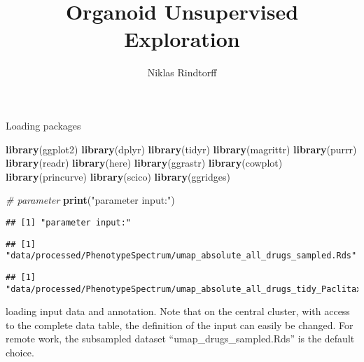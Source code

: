 \documentclass[
]{article}
\title{Organoid Unsupervised Exploration}
\author{Niklas Rindtorff}
\date{}
\newenvironment{Shaded}{\begin{snugshade}}{\end{snugshade}}
\newcommand{\CommentTok}[1]{\textcolor[rgb]{0.56,0.35,0.01}{\textit{#1}}}
\newcommand{\KeywordTok}[1]{\textcolor[rgb]{0.13,0.29,0.53}{\textbf{#1}}}
\newcommand{\NormalTok}[1]{#1}
\newcommand{\OperatorTok}[1]{\textcolor[rgb]{0.81,0.36,0.00}{\textbf{#1}}}
\newcommand{\StringTok}[1]{\textcolor[rgb]{0.31,0.60,0.02}{#1}}
\begin{document}
\maketitle

Loading packages

\begin{Shaded}
\begin{Highlighting}[]
\KeywordTok{library}\NormalTok{(ggplot2)}
\KeywordTok{library}\NormalTok{(dplyr)}
\KeywordTok{library}\NormalTok{(tidyr)}
\KeywordTok{library}\NormalTok{(magrittr)}
\KeywordTok{library}\NormalTok{(purrr)}
\KeywordTok{library}\NormalTok{(readr)}
\KeywordTok{library}\NormalTok{(here)}
\KeywordTok{library}\NormalTok{(ggrastr)}
\KeywordTok{library}\NormalTok{(cowplot)}
\KeywordTok{library}\NormalTok{(princurve)}
\KeywordTok{library}\NormalTok{(scico)}
\KeywordTok{library}\NormalTok{(ggridges)}

\CommentTok{# parameter}
\KeywordTok{print}\NormalTok{(}\StringTok{"parameter input:"}\NormalTok{)}
\end{Highlighting}
\end{Shaded}

\begin{verbatim}
## [1] "parameter input:"
\end{verbatim}

\begin{Shaded}
\end{Shaded}

\begin{verbatim}
## [1] "data/processed/PhenotypeSpectrum/umap_absolute_all_drugs_sampled.Rds"
\end{verbatim}

\begin{Shaded}
\end{Shaded}

\begin{verbatim}
## [1] "data/processed/PhenotypeSpectrum/umap_absolute_all_drugs_tidy_Paclitaxel.Rds"
\end{verbatim}

loading input data and annotation. Note that on the central cluster,
with access to the complete data table, the definition of the input can
easily be changed. For remote work, the subsampled dataset
``umap\_drugs\_sampled.Rds'' is the default choice.
\end{document}
